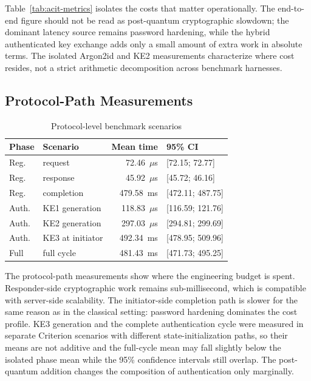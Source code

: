 \documentclass[conference]{IEEEtran}
\begin{document}
Table~\ref{tab:acit-metrics} isolates the costs that matter operationally. The end-to-end figure should not be read as post-quantum cryptographic slowdown; the dominant latency source remains password hardening, while the hybrid authenticated key exchange adds only a small amount of extra work in absolute terms. The isolated Argon2id and KE2 measurements characterize where cost resides, not a strict arithmetic decomposition across benchmark harnesses.

\subsection{Protocol-Path Measurements}

\begin{table}[t]
\caption{Protocol-level benchmark scenarios}
\label{tab:acit-protocol}
\centering
\scriptsize
\begin{tabularx}{\columnwidth}{@{}L{1.35cm}L{1.75cm}rY@{}}
\toprule
Phase & Scenario & Mean time & 95\% CI \\
\midrule
Reg. & request & 72.46~$\mu$s & [72.15; 72.77] \\
Reg. & response & 45.92~$\mu$s & [45.72; 46.16] \\
Reg. & completion & 479.58~ms & [472.11; 487.75] \\
Auth. & KE1 generation & 118.83~$\mu$s & [116.59; 121.76] \\
Auth. & KE2 generation & 297.03~$\mu$s & [294.81; 299.69] \\
Auth. & KE3 at initiator & 492.34~ms & [478.95; 509.96] \\
Full & full cycle & 481.43~ms & [471.73; 495.25] \\
\bottomrule
\end{tabularx}
\end{table}

The protocol-path measurements show where the engineering budget is spent. Responder-side cryptographic work remains sub-millisecond, which is compatible with server-side scalability. The initiator-side completion path is slower for the same reason as in the classical setting: password hardening dominates the cost profile. KE3 generation and the complete authentication cycle were measured in separate Criterion scenarios with different state-initialization paths, so their means are not additive and the full-cycle mean may fall slightly below the isolated phase mean while the 95\% confidence intervals still overlap. The post-quantum addition changes the composition of authentication only marginally.
\end{document}
